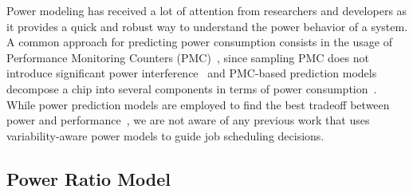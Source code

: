 
Power modeling has received a lot of attention from researchers and developers as it
provides a quick and robust way to understand the power behavior of a system.  A common
approach for predicting power consumption consists in the usage of Performance Monitoring
Counters
(PMC)~\cite{Bertran:2010:DRP:1810085.1810108,Singh:2009:RTP:1577129.1577137,Bellosa:2000:BED:566726.566736,Bircher:2012:CSP:2196827.2196987,Bircher:2005:RIM:1077603.1077668,Li:2003:RME:781027.781048},
since sampling PMC does not introduce significant power
interference~\cite{Joseph:2001:RPE:383082.383119,Isci:2003:RPM:956417.956567} and
PMC-based prediction models decompose a chip into several components in terms of power
consumption~\cite{Bertran:2010:DRP:1810085.1810108}.  While power prediction models are
employed to find the best tradeoff between power and
performance~\cite{Gholkar:2016:PTH:2967938.2967961}, we are not aware of any previous work
that uses variability-aware power models to guide job scheduling decisions.  



\subsection{Power Ratio Model}
\label{sec:naive_model}

